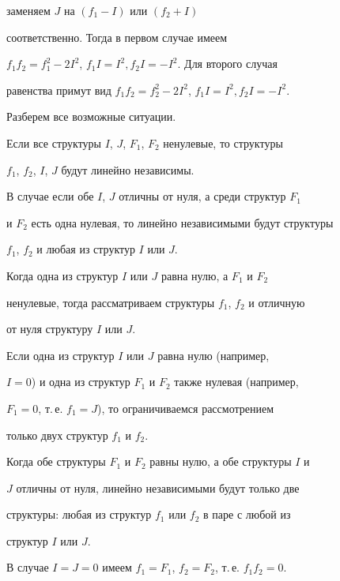 заменяем $J$ на $(f_1-I)$ или $(f_2+I)$


соответственно. Тогда в первом случае имеем


$f_1f_2=f_1^2-2I^2$, $f_1I=I^2,f_2I=-I^2$. Для второго случая


равенства примут вид $f_1f_2=f_2^2-2I^2$, $f_1I=I^2,f_2I=-I^2$.





Разберем все возможные ситуации.





Если все структуры $I$, $J$, $F_1$, $F_2$ ненулевые, то структуры


$f_1$, $f_2$, $I$, $J$ будут линейно независимы.





В случае если обе $I$, $J$ отличны от нуля, а среди структур $F_1$


и $F_2$ есть одна нулевая, то линейно независимыми будут структуры


$f_1$, $f_2$ и любая из структур $I$ или $J$.





Когда одна из структур $I$ или $J$ равна нулю, а $F_1$ и $F_2$


ненулевые, тогда рассматриваем структуры $f_1$, $f_2$ и отличную


от нуля структуру $I$ или $J$.





Если одна из структур $I$ или $J$ равна нулю (например,


$I=0$) и одна из структур $F_1$ и $F_2$ также нулевая (например,


$F_1=0$, т.\,е. $f_1=J$), то ограничиваемся рассмотрением


только двух структур $f_1$ и $f_2$.





Когда обе структуры $F_1$ и $F_2$ равны нулю, а обе структуры $I$ и


$J$ отличны от нуля, линейно независимыми будут только две


структуры: любая из структур $f_1$ или $f_2$ в паре с любой из


структур $I$ или $J$.





В случае $I=J=0$ имеем $f_1=F_1$, $f_2=F_2$, т.\,е. $f_1f_2=0$.


